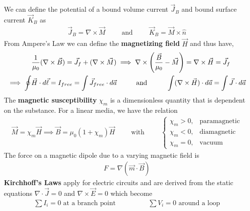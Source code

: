 We can define the potential of a bound volume current $\vec{J}_B$ and bound surface current $\vec{K}_B$ as
\begin{align}
	\vec{J}_B = \nabla \times \vec{M} \hspace{1cm}\textrm{and}\hspace{1cm}\vec{K}_B = \vec{M}\times \hat{n}
\end{align}
From Ampere's Law we can define the \textbf{magnetizing field} $\vec{H}$ and thus have,
\begin{align}
	&\frac{1}{\mu_0}(\nabla \times \vec{B}) = \vec{J}_{f}+(\nabla \times \vec{M}) \implies \nabla \times \left(\frac{\vec{B}}{\mu_0}-\vec{M}\right) = \nabla \times \vec{H}=\vec{J}_f \\ \implies \oint &\vec{H}\cdot d\vec{\ell} = I_{free} = \int \vec{J}_{free}\cdot d\vec{a}  \andspace{1cm}
	\int (\nabla \times \vec{H})\cdot d\vec{a} = \int \vec{J}\cdot d\vec{a}
\end{align}
The \textbf{magnetic susceptibility} $\chi_m$ is a dimensionless quantity that is dependent on the substance. For a linear media, we have the relation
\begin{align}
	\vec{M} = \chi_m \vec{H} \implies \vec{B} = \mu_0(1+\chi_m)\vec{H}\hspace{1cm}\textrm{with}\hspace{1cm}
	\begin{cases}
		\chi_m > 0, & \textrm{paramagnetic} \\
		\chi_m < 0, & \textrm{diamagnetic} \\
		\chi_m = 0, & \textrm{vacuum}
	\end{cases}
\end{align}
The force on a magnetic dipole due to a varying magnetic field is
\begin{align}
	F=\nabla (\vec{m}\cdot \vec{B})
\end{align}
\textbf{Kirchhoff's Laws} apply for electric circuits and are derived from the static equations $\nabla \cdot \vec{J}=0$ and $\nabla \times \vec{E}=0$ which become
\begin{align}
	\sum I_i = 0 \textrm{ at a branch point}\hspace{2cm}\sum V_i = 0 \textrm{ around a loop}
\end{align}